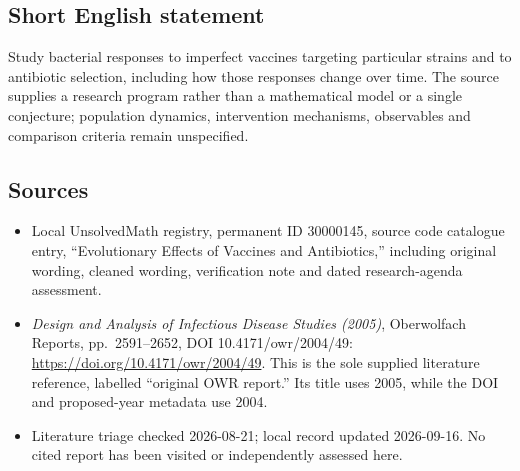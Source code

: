 \documentclass[11pt]{article}
\begin{document}
\subsection{Short English statement}
Study bacterial responses to imperfect vaccines targeting particular strains and to antibiotic selection, including how those responses change over time. The source supplies a research program rather than a mathematical model or a single conjecture; population dynamics, intervention mechanisms, observables and comparison criteria remain unspecified.
\subsection{Sources}
\begin{itemize}
\item Local UnsolvedMath registry, permanent ID 30000145, source code catalogue entry, ``Evolutionary Effects of Vaccines and Antibiotics,'' including original wording, cleaned wording, verification note and dated research-agenda assessment.
\item \emph{Design and Analysis of Infectious Disease Studies (2005)}, Oberwolfach Reports, pp.\ 2591--2652, DOI 10.4171/owr/2004/49: \url{https://doi.org/10.4171/owr/2004/49}. This is the sole supplied literature reference, labelled ``original OWR report.'' Its title uses 2005, while the DOI and proposed-year metadata use 2004.
\item Literature triage checked 2026-08-21; local record updated 2026-09-16. No cited report has been visited or independently assessed here.
\end{itemize}
\end{document}
